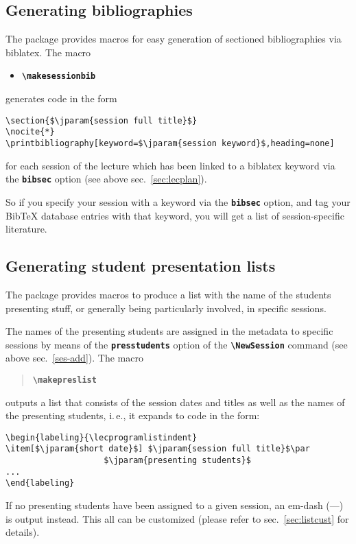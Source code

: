 \documentclass[english]{article}
\newcommand*\jmacro[1]{\textbf{\texttt{#1}}}
\newcommand*\jcsmacro[1]{\jmacro{\textbackslash{#1}}}
\newcommand*\joption[1]{\textbf{\texttt{#1}}}
\newcommand*\jparam[1]{\angus #1\angud}
\begin{document}
\subsection{Generating bibliographies\label{sub:bibliographies}}

The package provides macros for easy generation of sectioned bibliographies
via \textsf{biblatex}. The macro
\begin{itemize}
\item \jcsmacro{makesessionbib}
\end{itemize}
generates code in the form
\begin{lstlisting}[basicstyle={\small\ttfamily},frame=single,
                   escapechar=\$,moretexcs={[1]{printbibliography}}]
\section{$\jparam{session full title}$}
\nocite{*}
\printbibliography[keyword=$\jparam{session keyword}$,heading=none]
\end{lstlisting}
 for each session of the lecture which has been linked to a \textsf{biblatex}
keyword via the \joption{bibsec} option (see above sec.~\ref{sec:lecplan}).

So if you specify your session with a keyword via the \joption{bibsec}
option, and tag your Bib\TeX{} database entries with that keyword,
you will get a list of session-specific literature.


\subsection{Generating student presentation lists}\label{sec:preslists}

The package provides macros to produce a list with the name of the students presenting
stuff, or generally being particularly involved, in specific sessions.

The names of the presenting students are assigned in the metadata to specific sessions
by means of the \joption{presstudents} option of the \jcsmacro{NewSession} command
(see above sec.~\ref{ses-add}). The macro

\begin{quote}
\jcsmacro{makepreslist}
\end{quote}
outputs a list that consists of the session dates and titles as well as the names of the
presenting students, i.\,e., it expands to code in the form:
\begin{lstlisting}[language={[LaTeX]TeX},basicstyle={\small\ttfamily},
                   escapechar=\$,frame=single]
\begin{labeling}{\lecprogramlistindent}
\item[$\jparam{short date}$] $\jparam{session full title}$\par
                    $\jparam{presenting students}$
...
\end{labeling}
\end{lstlisting}
If no presenting students have been assigned to a given session,
an em-dash (---) is output instead.
This all can be customized (please refer to sec.~\ref{sec:listcust} for details).
\end{document}
